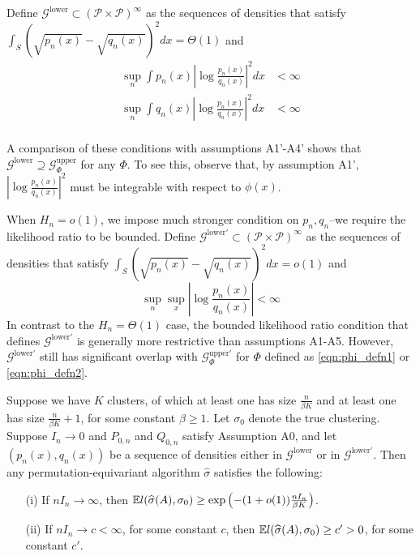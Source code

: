 \documentclass{article}
\begin{document}
Define $\mathcal{G}^{\textrm{lower}} \subset (\mathcal{P} \times \mathcal{P})^\infty$ as the sequences of densities that satisfy $\int_S (\sqrt{p_n(x)} - \sqrt{q_n(x)})^2 dx = \Theta(1)$ and
\begin{align*}
  \sup_n \int p_n(x) \left| \log \frac{p_n(x)}{q_n(x)} \right|^2 dx &< \infty \\
  \sup_n \int q_n(x) \left| \log \frac{p_n(x)}{q_n(x)} \right|^2 dx &< \infty \\
\end{align*}

A comparison of these conditions with assumptions A1'-A4' shows that $\mathcal{G}^{\textrm{lower}} \supseteq \mathcal{G}^{\textrm{upper}}_\Phi$ for any $\Phi$. To see this, observe that, by assumption A1', $\left| \log \frac{p_n(x)}{q_n(x)} \right|^2$ must be integrable with respect to $\phi(x)$. 


When $H_n = o(1)$, we impose much stronger condition on $p_n, q_n$--we require the likelihood ratio to be bounded. Define $\mathcal{G}^{\textrm{lower} \prime} \subset (\mathcal{P} \times \mathcal{P})^\infty$ as the sequences of densities that satisfy $\int_S (\sqrt{p_n(x)} - \sqrt{q_n(x)})^2 dx = o(1)$ and
\[
  \sup_n \sup_x  \left| \log \frac{p_n(x)}{q_n(x)} \right| < \infty
\]
In contrast to the $H_n = \Theta(1)$ case, the bounded likelihood ratio condition that defines $\mathcal{G}^{\textrm{lower}\prime}$ is generally more restrictive than assumptions A1-A5. However, $\mathcal{G}^{\textrm{lower}\prime}$ still has significant overlap with $\mathcal{G}^{\textrm{upper} \prime}_\Phi$ for $\Phi$ defined as \ref{eqn:phi_defn1} or \ref{eqn:phi_defn2}.


\begin{theorem}
\label{thm:lower_bound}
Suppose we have $K$ clusters, of which at least one has size $\frac{n}{\beta K}$ and at least one has size $\frac{n}{\beta K}+1$, for some constant $\beta \geq 1$. Let $\sigma_0$ denote the true clustering. Suppose $I_n \rightarrow 0$ and $P_{0,n}$ and $Q_{0,n}$ satisfy Assumption A0, and let $(p_n(x), q_n(x))$ be a sequence of densities either in  $\mathcal{G}^{\textrm{lower}}$ or in  $\mathcal{G}^{\textrm{lower} \prime}$. Then any permutation-equivariant algorithm $\hat{\sigma}$ satisfies the following:
\begin{itemize}
\item[(i)] If $nI_n \rightarrow \infty$, then ${\mathbb E} l(\widehat{\sigma}(A), \sigma_0) \ge \exp \left( - (1 + o(1)) \frac{ n I_n}{\beta K} \right)$.
\item[(ii)] If $nI_n \rightarrow c < \infty$, for some constant $c$, then ${\mathbb E}  l(\widehat{\sigma}(A), \sigma_0) \geq c' > 0$, for some constant $c'$.
\end{itemize}
\end{theorem}
\end{document}
